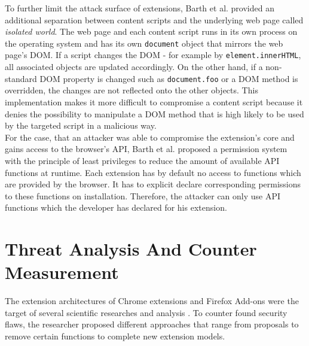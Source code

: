 	
	To further limit the attack surface of extensions, Barth et al. provided an additional separation between content scripts and the underlying web page called \textit{isolated world}. The web page and each content script runs in its own process on the operating system and has its own \texttt{document} object that mirrors the web page's DOM. If a script changes the DOM - for example by \texttt{element.innerHTML}, all associated objects are updated accordingly. On the other hand, if a non-standard DOM property is changed such as \texttt{document.foo} or a DOM method is overridden, the changes are not reflected onto the other objects. This implementation makes it more difficult to compromise a content script because it denies the possibility to manipulate a DOM method that is high likely to be used by the targeted script in a malicious way. \\
	For the case, that an attacker was able to compromise the extension's core and gains access to the browser's API, Barth et al. proposed a permission system with the principle of least privileges to reduce the amount of available API functions at runtime. Each extension has by default no access to functions which are provided by the browser. It has to explicit declare corresponding permissions to these functions on installation. Therefore, the attacker can only use API functions which the developer has declared for his extension. \\
 
\section{Threat Analysis And Counter Measurement}
	
	The extension architectures of Chrome extensions and Firefox Add-ons were the target of several scientific researches and analysis \cite{Barth10protectingbrowsers,Carlini:2012:EGC:2362793.2362800,Hallaraker:2005:DMJ:1078029.1078861,Liu12chromeextensions:,TerLouw:2007:EWB:1420581.1420583,cs2015sentinel}. To counter found security flaws, the researcher proposed different approaches that range from proposals to remove certain functions to complete new extension models. 
	
